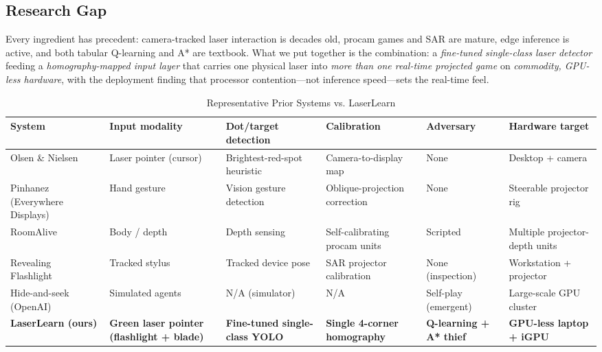\documentclass[conference]{IEEEtran}
\begin{document}
\subsection*{Research Gap}
Every ingredient has precedent: camera-tracked laser interaction is decades old,
procam games and SAR are mature, edge inference is active, and both tabular
Q-learning and A* are textbook. What we put together is the combination: a
\emph{fine-tuned single-class laser detector} feeding a \emph{homography-mapped
input layer} that carries one physical laser into \emph{more than one real-time
projected game} on \emph{commodity, GPU-less hardware}, with the deployment
finding that processor contention---not inference speed---sets the real-time feel.

\begin{table}[t]
\caption{Representative Prior Systems vs. LaserLearn}
\label{tab:compare}
\begin{center}
\renewcommand{\arraystretch}{1.25}
\begin{tabular}{|p{2.6cm}|p{2.4cm}|p{2.7cm}|p{2.2cm}|p{2.2cm}|p{2.0cm}|}
\hline
\textbf{System} & \textbf{Input modality} & \textbf{Dot/target detection} &
\textbf{Calibration} & \textbf{Adversary} & \textbf{Hardware target} \\
\hline
Olsen \& Nielsen~\cite{olsen2001} & Laser pointer (cursor) & Brightest-red-spot
heuristic & Camera-to-display map & None & Desktop + camera \\
\hline
Pinhanez (Everywhere Displays)~\cite{pinhanez2001} & Hand gesture & Vision gesture
detection & Oblique-projection correction & None & Steerable projector rig \\
\hline
RoomAlive~\cite{jones2014roomalive} & Body / depth & Depth sensing & Self-calibrating
procam units & Scripted & Multiple projector-depth units \\
\hline
Revealing Flashlight~\cite{ridel2014} & Tracked stylus & Tracked device pose &
SAR projector calibration & None (inspection) & Workstation + projector \\
\hline
Hide-and-seek (OpenAI)~\cite{baker2020} & Simulated agents & N/A (simulator) & N/A &
Self-play (emergent) & Large-scale GPU cluster \\
\hline
\textbf{LaserLearn (ours)} & \textbf{Green laser pointer (flashlight + blade)} &
\textbf{Fine-tuned single-class YOLO} & \textbf{Single 4-corner homography} &
\textbf{Q-learning + A* thief} & \textbf{GPU-less laptop + iGPU} \\
\hline
\end{tabular}
\end{center}
\end{table}
\end{document}
